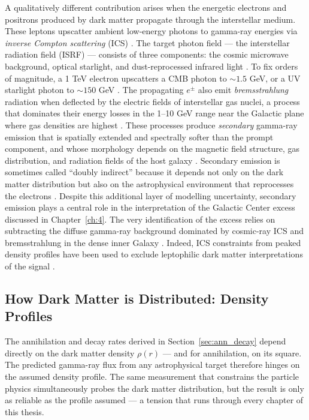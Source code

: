 A qualitatively different contribution arises when the energetic electrons and positrons produced by dark matter propagate through the interstellar medium.
These leptons upscatter ambient low-energy photons to gamma-ray energies via \textit{inverse Compton scattering} (ICS) \cite{Cirelli:2024ssz,Pinetti:2021jjs}.
The target photon field --- the interstellar radiation field (ISRF) --- consists of three components: the cosmic microwave background, optical starlight, and dust-reprocessed infrared light \cite{Cirelli:2024ssz,Pinetti:2021jjs}.
To fix orders of magnitude, a 1 TeV electron upscatters a CMB photon to $\sim 1.5$ GeV, or a UV starlight photon to $\sim 150$ GeV \cite{Cirelli:2024ssz}.
The propagating $e^\pm$ also emit \textit{bremsstrahlung} radiation when deflected by the electric fields of interstellar gas nuclei, a process that dominates their energy losses in the 1--10 GeV range near the Galactic plane where gas densities are highest \cite{Cirelli:2024ssz}.
These processes produce \textit{secondary} gamma-ray emission that is spatially extended and spectrally softer than the prompt component, and whose morphology depends on the magnetic field structure, gas distribution, and radiation fields of the host galaxy \cite{Cirelli:2024ssz,Pinetti:2021jjs}.
Secondary emission is sometimes called ``doubly indirect'' because it depends not only on the dark matter distribution but also on the astrophysical environment that reprocesses the electrons \cite{Cirelli:2024ssz}.
Despite this additional layer of modelling uncertainty, secondary emission plays a central role in the interpretation of the Galactic Center excess discussed in Chapter~\ref{ch:4}.
The very identification of the excess relies on subtracting the diffuse gamma-ray background dominated by cosmic-ray ICS and bremsstrahlung in the dense inner Galaxy \cite{Cirelli:2024ssz,Hooper:2024}.
Indeed, ICS constraints from peaked density profiles have been used to exclude leptophilic dark matter interpretations of the signal \cite{Cirelli:2024ssz}.

\subsection{How Dark Matter is Distributed: Density Profiles}
\label{sec:density_profiles}

The annihilation and decay rates derived in Section~\ref{sec:ann_decay} depend directly on the dark matter density $\rho(r)$ --- and for annihilation, on its square.
The predicted gamma-ray flux from any astrophysical target therefore hinges on the assumed density profile.
The same measurement that constrains the particle physics simultaneously probes the dark matter distribution, but the result is only as reliable as the profile assumed --- a tension that runs through every chapter of this thesis.

